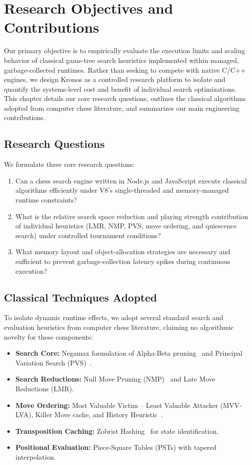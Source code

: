 \chapter{Research Objectives and Contributions}
\label{ch:contributions}

Our primary objective is to empirically evaluate the execution limits and scaling behavior of classical game-tree search heuristics implemented within managed, garbage-collected runtimes. Rather than seeking to compete with native C/C++ engines, we design Kronos as a controlled research platform to isolate and quantify the systems-level cost and benefit of individual search optimizations. This chapter details our core research questions, outlines the classical algorithms adopted from computer chess literature, and summarizes our main engineering contributions.

\section{Research Questions}
We formulate three core research questions:
\begin{enumerate}
    \item Can a chess search engine written in Node.js and JavaScript execute classical algorithms efficiently under V8's single-threaded and memory-managed runtime constraints?
    \item What is the relative search space reduction and playing strength contribution of individual heuristics (LMR, NMP, PVS, move ordering, and quiescence search) under controlled tournament conditions?
    \item What memory layout and object-allocation strategies are necessary and sufficient to prevent garbage-collection latency spikes during continuous execution?
\end{enumerate}

\section{Classical Techniques Adopted}
To isolate dynamic runtime effects, we adopt several standard search and evaluation heuristics from computer chess literature, claiming no algorithmic novelty for these components:
\begin{itemize}
    \item \textbf{Search Core:} Negamax formulation of Alpha-Beta pruning~\cite{knuth1975analysis} and Principal Variation Search (PVS)~\cite{marsland1982parallel}.
    \item \textbf{Search Reductions:} Null Move Pruning (NMP)~\cite{donninger1993null} and Late Move Reductions (LMR).
    \item \textbf{Move Ordering:} Most Valuable Victim -- Least Valuable Attacker (MVV-LVA), Killer Move cache, and History Heuristic~\cite{schaeffer1989history}.
    \item \textbf{Transposition Caching:} Zobrist Hashing~\cite{zobrist1970new} for state identification.
    \item \textbf{Positional Evaluation:} Piece-Square Tables (PSTs) with tapered interpolation.
\end{itemize}

